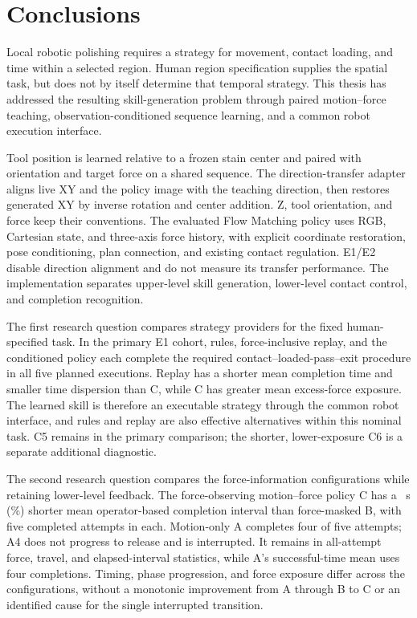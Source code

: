 \chapter{Conclusions}
\label{chap:conclusions}

Local robotic polishing requires a strategy for movement, contact loading, and time within a selected region. Human region specification supplies the spatial task, but does not by itself determine that temporal strategy. This thesis has addressed the resulting skill-generation problem through paired motion--force teaching, observation-conditioned sequence learning, and a common robot execution interface.

Tool position is learned relative to a frozen stain center and paired with orientation and target force on a shared sequence. The direction-transfer adapter aligns live XY and the policy image with the teaching direction, then restores generated XY by inverse rotation and center addition. Z, tool orientation, and force keep their conventions. The evaluated Flow Matching policy uses RGB, Cartesian state, and three-axis force history, with explicit coordinate restoration, pose conditioning, plan connection, and existing contact regulation. E1/E2 disable direction alignment and do not measure its transfer performance. The implementation separates upper-level skill generation, lower-level contact control, and completion recognition.

The first research question compares strategy providers for the fixed human-specified task. In the primary E1 cohort, rules, force-inclusive replay, and the conditioned policy each complete the required contact--loaded-pass--exit procedure in all five planned executions. Replay has a shorter mean completion time and smaller time dispersion than C, while C has greater mean excess-force exposure. The learned skill is therefore an executable strategy through the common robot interface, and rules and replay are also effective alternatives within this nominal task. C5 remains in the primary comparison; the shorter, lower-exposure C6 is a separate additional diagnostic.

The second research question compares the force-information configurations while retaining lower-level feedback. The force-observing motion--force policy C has a \BCSeconds~s (\BCPercent\%) shorter mean operator-based completion interval than force-masked B, with five completed attempts in each. Motion-only A completes four of five attempts; A4 does not progress to release and is interrupted. It remains in all-attempt force, travel, and elapsed-interval statistics, while A's successful-time mean uses four completions. Timing, phase progression, and force exposure differ across the configurations, without a monotonic improvement from A through B to C or an identified cause for the single interrupted transition.

